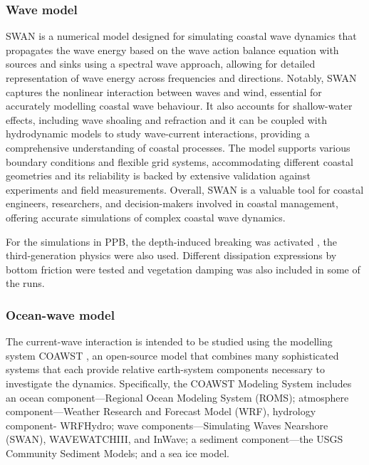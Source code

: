 \documentclass[12pt]{article}
\begin{document}
\subsubsection*{Wave model}

SWAN is a numerical model designed for simulating coastal wave dynamics that propagates the wave energy based on the wave action balance equation with sources and sinks using a spectral wave approach, allowing for detailed representation of wave energy across frequencies and directions. Notably, SWAN captures the nonlinear interaction between waves and wind, essential for accurately modelling coastal wave behaviour. It also accounts for shallow-water effects, including wave shoaling and refraction and it can be coupled with hydrodynamic models to study wave-current interactions, providing a comprehensive understanding of coastal processes. The model supports various boundary conditions and flexible grid systems, accommodating different coastal geometries and its reliability is backed by extensive validation against experiments and field measurements. Overall, SWAN is a valuable tool for coastal engineers, researchers, and decision-makers involved in coastal management, offering accurate simulations of complex coastal wave dynamics.

For the simulations in PPB, the depth-induced breaking was activated \parencite{Battjes1978}, the third-generation physics were also used. Different dissipation expressions by bottom friction were tested \parencite{Madsen_Poon_Graber_1988,Smith2011} and vegetation damping \parencite{Suzuki2011} was also included in some of the runs.

\subsubsection*{Ocean-wave model}

The current-wave interaction is intended to be studied using the modelling system COAWST \parencite{Warner2010}, an open-source model that combines many sophisticated systems that each provide relative earth-system components necessary to investigate the dynamics. Specifically, the COAWST Modeling System includes an ocean component—Regional Ocean Modeling System (ROMS); atmosphere component—Weather Research and Forecast Model (WRF), hydrology component- WRF\textunderscore Hydro; wave components—Simulating Waves Nearshore (SWAN), WAVEWATCHIII, and InWave; a sediment component—the USGS Community Sediment Models; and a sea ice model.
\end{document}
